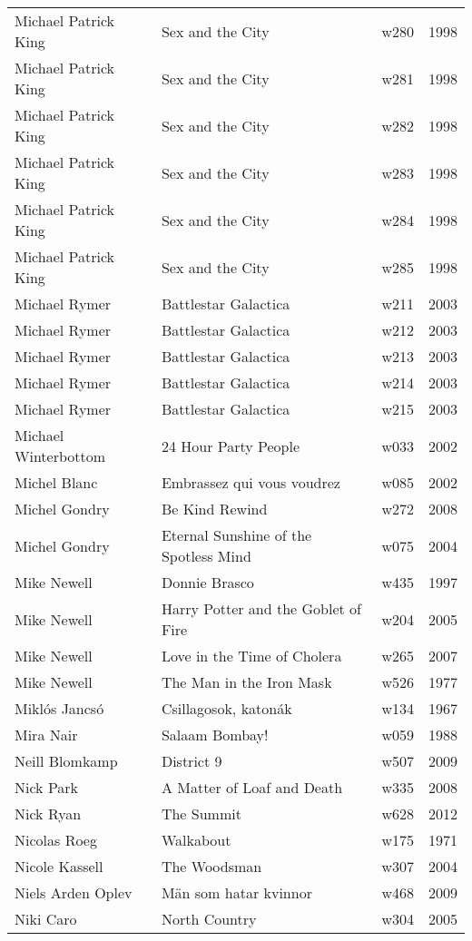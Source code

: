\documentclass{article}
\begin{document}
\begin {center}
\begin{longtable}{l p{10cm} l l}
Michael Patrick King & Sex and the City & w280 & 1998 \\
Michael Patrick King & Sex and the City & w281 & 1998 \\
Michael Patrick King & Sex and the City & w282 & 1998 \\
Michael Patrick King & Sex and the City & w283 & 1998 \\
Michael Patrick King & Sex and the City & w284 & 1998 \\
Michael Patrick King & Sex and the City & w285 & 1998 \\
Michael Rymer & Battlestar Galactica & w211 & 2003 \\
Michael Rymer & Battlestar Galactica & w212 & 2003 \\
Michael Rymer & Battlestar Galactica & w213 & 2003 \\
Michael Rymer & Battlestar Galactica & w214 & 2003 \\
Michael Rymer & Battlestar Galactica & w215 & 2003 \\
Michael Winterbottom & 24 Hour Party People & w033 & 2002 \\
Michel Blanc & Embrassez qui vous voudrez & w085 & 2002 \\
Michel Gondry & Be Kind Rewind & w272 & 2008 \\
Michel Gondry & Eternal Sunshine of the Spotless Mind & w075 & 2004 \\
Mike Newell & Donnie Brasco & w435 & 1997 \\
Mike Newell & Harry Potter and the Goblet of Fire & w204 & 2005 \\
Mike Newell & Love in the Time of Cholera & w265 & 2007 \\
Mike Newell & The Man in the Iron Mask & w526 & 1977 \\
Miklós Jancsó & Csillagosok, katonák & w134 & 1967 \\
Mira Nair & Salaam Bombay! & w059 & 1988 \\
Neill Blomkamp & District 9 & w507 & 2009 \\
Nick Park & A Matter of Loaf and Death & w335 & 2008 \\
Nick Ryan & The Summit & w628 & 2012 \\
Nicolas Roeg & Walkabout & w175 & 1971 \\
Nicole Kassell & The Woodsman & w307 & 2004 \\
Niels Arden Oplev & Män som hatar kvinnor & w468 & 2009 \\
Niki Caro & North Country & w304 & 2005 \\

\end{longtable}
\end{center}
\end{document}
